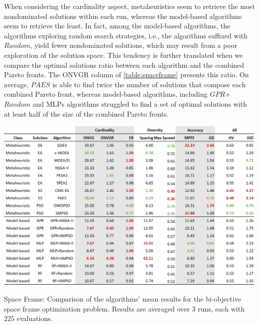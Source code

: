 When considering the cardinality aspect, metaheuristics seem to retrieve the most nondominated solutions within each run, whereas the model-based algorithms seem to retrieve the least. In fact, among the model-based algorithms, the algorithms exploring random search strategies, i.e., the algorithms suffixed with $Random$, yield fewer nondominated solutions, which may result from a poor exploration of the solution space. This tendency is further translated when we compare the optimal solutions ratio between each algorithm and the combined Pareto fronts. The \ac{ONVGR} column of \cref{table:spaceframe} presents this ratio. On average, $PAES$ is able to find twice the number of solutions that compose each combined Pareto front, whereas model-based algorithms, including $GPR$+$Random$ and \acp{MLP} algorithms struggled to find a set of optimal solutions with at least half of the size of the combined Pareto fronts. 

\begin{table}[h!]
	\centering
	\includegraphics[width=\textwidth]{Images/Evaluation/caadria/Results_Mean_20190416.PNG}
	\caption[Space Frame: Mean results of each algorithm, measured in terms of unary MOO performance indicators, discriminated per algorithms]{Space Frame: Comparison of the algorithms' mean results for the bi-objective space frame optimization problem. Results are averaged over $3$ runs, each with $225$ evaluations.}
	\label{table:spaceframe}
\end{table}

